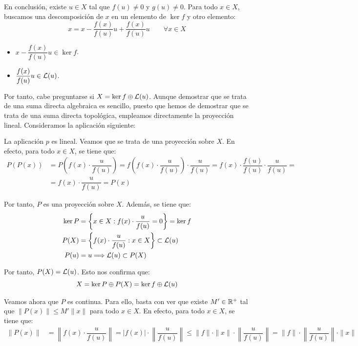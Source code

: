 \begin{ejercicio}
\begin{description}
    En conclusión, existe $u \in X$ tal que $f(u)\neq 0$ y $g(u)\neq 0$. Para todo $x\in X$, buscamos una descomposición de $x$ en un elemento de $\ker f$ y otro elemento:
    \begin{equation*}
        x = x - \dfrac{f(x)}{f(u)} u + \dfrac{f(x)}{f(u)} u\qquad \forall x \in X
    \end{equation*}
    \begin{itemize}
        \item $x - \dfrac{f(x)}{f(u)} u \in \ker f$.
        \item $\dfrac{f(x)}{f(u)} u \in \mathcal{L}(u)$.
    \end{itemize}

    Por tanto, cabe preguntarse si $X = \ker f \oplus \mathcal{L}(u)$. Aunque demostrar que se trata de una suma directa algebraica es sencillo, puesto que hemos de demostrar que se trata de una suma directa topológica, empleamos directamente la proyección lineal. Consideramos la aplicación siguiente:

    La aplicación $p$ es lineal. Veamos que se trata de una proyección sobre $X$. En efecto, para todo $x \in X$, se tiene que:
    \begin{align*}
        P(P(x)) &= P\left(f(x)\cdot \dfrac{u}{f(u)}\right) = f\left(f(x)\cdot \dfrac{u}{f(u)}\right)\cdot \dfrac{u}{f(u)} = f(x)\cdot \dfrac{f(u)}{f(u)}\cdot \dfrac{u}{f(u)} =\\&= f(x)\cdot \dfrac{u}{f(u)} = P(x)
    \end{align*}

    Por tanto, $P$ es una proyección sobre $X$. Además, se tiene que:
    \begin{align*}
        \ker P &= \left\{x \in X : f(x)\cdot \dfrac{u}{f(u)} = 0\right\} = \ker f\\
        P(X) &= \left\{f(x)\cdot \dfrac{u}{f(u)} : x \in X\right\}\subset \mathcal{L}(u)\\
        P(u) &= u\Longrightarrow \mathcal{L}(u) \subset P(X)
    \end{align*}

    Por tanto, $P(X) = \mathcal{L}(u)$. Esto nos confirma que:
    $$X = \ker P \oplus P(X) = \ker f \oplus \mathcal{L}(u)$$
    
    Veamos ahora que $P$ es continua. Para ello, basta con ver que existe $M' \in \mathbb{R}^+$ tal que $\|P(x)\| \leq M' \|x\|$ para todo $x \in X$. En efecto, para todo $x \in X$, se tiene que:
    \begin{align*}
        \|P(x)\| &= \left\|f(x)\cdot \dfrac{u}{f(u)}\right\| = |f(x)| \cdot \left\|\dfrac{u}{f(u)}\right\| \leq \|f\| \cdot \|x\| \cdot \left\|\dfrac{u}{f(u)}\right\| = \|f\| \cdot \left\|\dfrac{u}{f(u)}\right\| \cdot \|x\|
    \end{align*}


\end{description}
\end{ejercicio}
